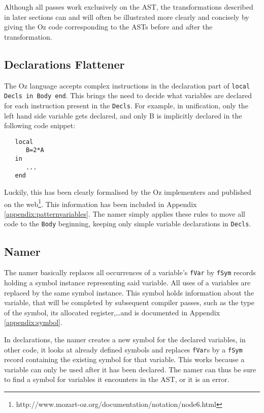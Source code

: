 \documentclass[a4paper]{memoir}
\begin{document}
Although all passes work exclusively on the AST, the transformations described in later sections can and will often be illustrated more clearly and concisely by giving the Oz code corresponding to the ASTs before and after the transformation. 

\subsection{Declarations Flattener}\label{sec:arch:declsflattener}
The Oz language accepts complex instructions in the declaration part of \lstinline!local Decls in Body end!. This brings the need to decide what variables are declared for each instruction present in the \lstinline!Decls!. 
For example, in unification, only the left hand side variable gets declared, and only B is implicitly declared in the following code snippet:
\begin{lstlisting}
   local
      B=2*A
   in
      ...
   end
\end{lstlisting}
Luckily, this has been clearly formalised by the Oz implementers and published on the web\footnote[]{http://www.mozart-oz.org/documentation/notation/node6.html}. This information has been included in Appendix \ref{appendix:patternvariables}. The namer simply applies these rules to move all code to the \lstinline!Body! beginning, keeping only simple variable declarations in \lstinline!Decls!.

\subsection{Namer}\label{sec:arch:namer}
The namer  basically replaces all occurrences of a variable's \lstinline!fVar! by \lstinline!fSym! records holding a symbol instance representing said variable. All uses of a variables are replaced by the same symbol instance. This symbol holds information about the variable, that will be completed by subsequent compiler passes, such as the type of the symbol, its allocated register,\ldots and is documented in Appendix \ref{appendix:symbol}.

In declarations, the namer creates a new symbol for the declared variables, in other code, it looks at already defined symbols and replaces \lstinline!fVar!s by a \lstinline!fSym! record containing the existing symbol for that variable. This works because a variable can only be used after it has been declared. The namer can thus be sure to find a symbol for variables it encounters in the AST, or it is an error.
\end{document}
